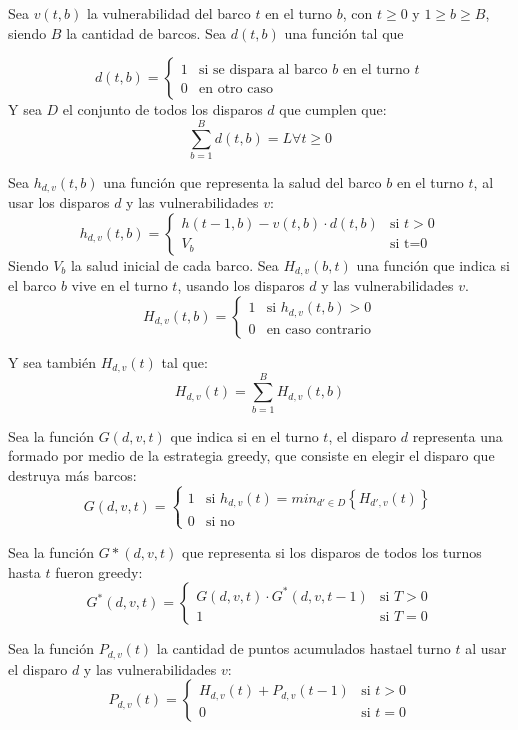 \documentclass{article}
\begin{document}
Sea $v(t,b)$ la vulnerabilidad del barco $t$ en el turno $b$, con $t\geq0$ y $1\geq b \geq B$, siendo $B$ la cantidad de barcos.
Sea $d(t,b)$ una función tal que

\[
    d(t,b)=
    \begin{cases}
        1 & \text{si se dispara al barco $b$ en el turno $t$} \\
        0 & \text{en otro caso}
    \end{cases}
\]
Y sea $D$ el conjunto de todos los disparos $d$ que cumplen que:
$$ \sum_{b=1}^{B} d(t,b) = L  \forall t \geq 0 $$

Sea $h_{d,v} (t,b)$ una función que representa la salud del barco $b$ en el turno $t$, al usar los disparos $d$ y las vulnerabilidades $v$:
\[
    h_{d,v}(t,b)=
    \begin{cases}
        h(t-1,b)-v(t,b) \cdot d(t,b) & \text{si $t>0$} \\
        V_b & \text{si t=0}
    \end{cases}
\]
Siendo $V_b$ la salud inicial de cada barco. Sea $H_{d,v}(b,t)$ una función que indica si el barco $b$ vive en el turno $t$, usando los disparos $d$ y las vulnerabilidades $v$.
\[
    H_{d,v}(t,b)=
    \begin{cases}
        1 & \text{si $h_{d,v}(t,b)>0$} \\
        0 & \text{en caso contrario}
    \end{cases}
\]

Y sea también $H_{d,v}(t)$ tal que: $$H_{d,v}(t)=\sum_{b=1}^{B} H_{d,v}(t,b)$$

Sea la función $G(d,v,t)$ que indica si en el turno $t$, el disparo $d$ representa una formado por medio de la estrategia greedy, que consiste en elegir el disparo que destruya más barcos:
\[
    G(d,v,t)=
    \begin{cases}
        1 & \text{si $h_{d,v}(t)=min_{d' \in D} \left \{ H_{d',v}(t) \right \} $} \\
        0 & \text{si no}
    \end{cases}
\]

Sea la función $G*(d,v,t)$ que representa si los disparos de todos los turnos hasta $t$ fueron greedy:
\[
    G^*(d,v,t)=
    \begin{cases}
        G(d,v,t) \cdot G^*(d,v,t-1) & \text{si $T>0$} \\
        1 & \text{si $T=0$}
    \end{cases}
\]

Sea la función $P_{d,v}(t)$ la cantidad de puntos acumulados hastael turno $t$ al usar el disparo $d$ y las vulnerabilidades $v$:
\[
    P_{d,v}(t)=
    \begin{cases}
        H_{d,v}(t) + P_{d,v}(t-1) & \text{si $t>0$} \\
        0 & \text{si $t=0$}
    \end{cases}
\]
\end{document}
